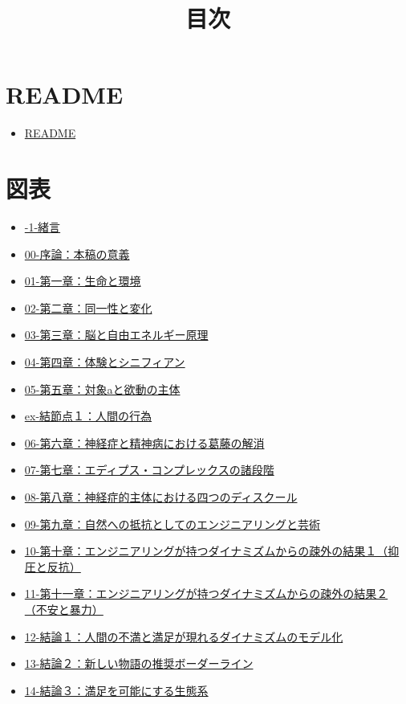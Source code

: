 \documentclass[8pt, a5paper]{ltjsarticle}
\title{目次}
\author{}
\date{}
\providecommand{\tightlist}{%
  \setlength{\itemsep}{0pt}\setlength{\parskip}{0pt}}
\begin{document}
\maketitle

\section{README}\label{readme}

\begin{itemize}
\tightlist
\item
  \href{aoko-yano-public/personal_knowledge_management/stock/text/虚無・無知・飢餓―不安の時代における諸学の綜合/README}{README}
\end{itemize}

\section{図表}\label{ux56f3ux8868}

\begin{itemize}
\tightlist
\item
  \url{-1-緒言}
\item
  \url{00-序論：本稿の意義}
\item
  \url{01-第一章：生命と環境}
\item
  \url{02-第二章：同一性と変化}
\item
  \url{03-第三章：脳と自由エネルギー原理}
\item
  \url{04-第四章：体験とシニフィアン}
\item
  \url{05-第五章：対象aと欲動の主体}
\item
  \url{ex-結節点１：人間の行為}
\item
  \url{06-第六章：神経症と精神病における葛藤の解消}
\item
  \url{07-第七章：エディプス・コンプレックスの諸段階}
\item
  \url{08-第八章：神経症的主体における四つのディスクール}
\item
  \url{09-第九章：自然への抵抗としてのエンジニアリングと芸術}
\item
  \url{10-第十章：エンジニアリングが持つダイナミズムからの疎外の結果１（抑圧と反抗）}
\item
  \url{11-第十一章：エンジニアリングが持つダイナミズムからの疎外の結果２（不安と暴力）}
\item
  \url{12-結論１：人間の不満と満足が現れるダイナミズムのモデル化}
\item
  \url{13-結論２：新しい物語の推奨ボーダーライン}
\item
  \url{14-結論３：満足を可能にする生態系}
\end{itemize}
\end{document}
